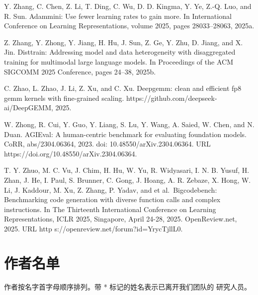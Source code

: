 \documentclass[
  10
]{article}
\begin{document}
Y. Zhang, C. Chen, Z. Li, T. Ding, C. Wu, D. D. Kingma, Y. Ye, Z.-Q.
Luo, and R. Sun. Adammini: Use fewer learning rates to gain more. In
International Conference on Learning Representations, volume 2025, pages
28033--28063, 2025a.



Z. Zhang, Y. Zhong, Y. Jiang, H. Hu, J. Sun, Z. Ge, Y. Zhu, D. Jiang,
and X. Jin. Disttrain: Addressing model and data heterogeneity with
disaggregated training for multimodal large language models. In
Proceedings of the ACM SIGCOMM 2025 Conference, pages 24--38, 2025b.

C. Zhao, L. Zhao, J. Li, Z. Xu, and C. Xu. Deepgemm: clean and efficient
fp8 gemm kernels with fine-grained scaling.
https://github.com/deepseek-ai/DeepGEMM, 2025.

W. Zhong, R. Cui, Y. Guo, Y. Liang, S. Lu, Y. Wang, A. Saied, W. Chen,
and N. Duan. AGIEval: A human-centric benchmark for evaluating
foundation models. CoRR, abs/2304.06364, 2023. doi:
10.48550/arXiv.2304.06364. URL
https://doi.org/10.48550/arXiv.2304.06364.

T. Y. Zhuo, M. C. Vu, J. Chim, H. Hu, W. Yu, R. Widyasari, I. N. B.
Yusuf, H. Zhan, J. He, I. Paul, S. Brunner, C. Gong, J. Hoang, A. R.
Zebaze, X. Hong, W. Li, J. Kaddour, M. Xu, Z. Zhang, P. Yadav, and et
al.~Bigcodebench: Benchmarking code generation with diverse function
calls and complex instructions. In The Thirteenth International
Conference on Learning Representations, ICLR 2025, Singapore, April
24-28, 2025. OpenReview.net, 2025. URL http
s://openreview.net/forum?id=YrycTjllL0.

\section{作者名单}\label{a.-author-list}

作者按名字首字母顺序排列。带 * 标记的姓名表示已离开我们团队的
研究人员。
\end{document}
